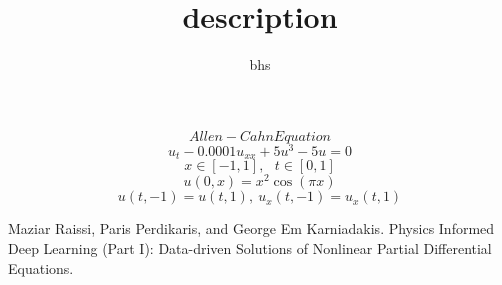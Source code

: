 \documentclass[12pt]{amsart}
\title{description}
\author{bhs}
\begin{document}
\maketitle


$$Allen-Cahn Equation$$
$$ u_t - 0.0001 u_{xx} + 5 u^3 - 5 u = 0$$
$$x \in [-1,1], \ \ \ t \in [0,1]$$
$$u(0, x) = x^2 \cos(\pi x)$$
$$u(t,-1) = u(t,1),\ u_x(t,-1) = u_x(t,1) $$




\begin{thebibliography}{10}
 Maziar Raissi, Paris Perdikaris, and George Em Karniadakis. Physics Informed Deep Learning (Part I): Data-driven Solutions of Nonlinear Partial Differential Equations.
\end{thebibliography}
\end{document}
